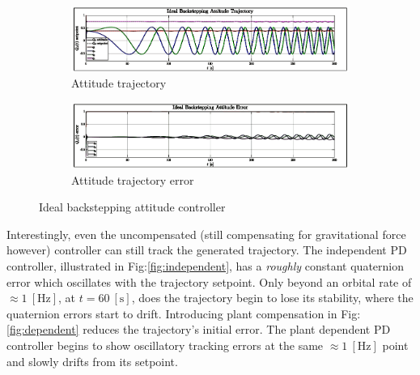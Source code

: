 \begin{figure}[htbp]
\centering
\vspace{-8pt}
\begin{subfigure}{0.9\textwidth}
\centering
\includegraphics[width=\textwidth]{graphs/IBC_Trajectory}
\vspace{-18pt}
\caption{Attitude trajectory}
\label{fig:backstepping_trajectory}
\end{subfigure}
\begin{subfigure}{0.9\textwidth}
\centering
\includegraphics[width=\textwidth]{graphs/IBC_Error}
\vspace{-18pt}
\caption{Attitude trajectory error}
\label{fig:backstepping_error}
\end{subfigure}
\vspace{-10pt}
\caption{Ideal backstepping attitude controller}
\label{fig:backstepping}
\end{figure}
Interestingly, even the uncompensated (still compensating for gravitational force however) controller can still track the generated trajectory. The independent PD controller, illustrated in Fig:\ref{fig:independent}, has a \emph{roughly} constant quaternion error which oscillates with the trajectory setpoint. Only beyond an orbital rate of $\approx 1~[\text{Hz}]$, at $t=60~[\text{s}]$, does the trajectory begin to lose its stability, where the quaternion errors start to drift. Introducing plant compensation in Fig:\ref{fig:dependent} reduces the trajectory's initial error. The plant dependent PD controller begins to show oscillatory tracking errors at the same $\approx 1~[\text{Hz}]$ point and slowly drifts from its setpoint.
\par
